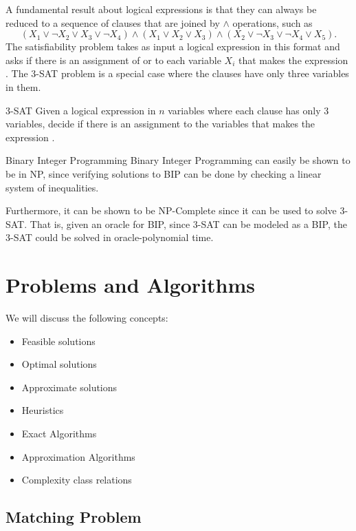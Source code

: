 A fundamental result about logical expressions is that they can always be reduced to a sequence of clauses that are joined by $\land$ operations, such as 
\begin{equation}
(X_1 \lor \neg X_2 \lor X_3 \lor \neg X_4) \land (X_1 \lor X_2 \lor X_3) \land (X_2 \lor \neg X_3 \lor \neg X_4 \lor X_5).
\end{equation}
The satisfiability problem takes as input a logical expression in this format and asks if there is an assignment of \true  or \false to each variable $X_i$ that makes the expression \true.  The 3-SAT problem is a special case where the clauses have only three variables in them.
 
\begin{general}{3-SAT}{\npcomplete}
Given a logical expression in $n$ variables where each clause has only 3 variables, decide if there is an assignment to the variables that makes the expression \true.
\end{general}


\begin{general}{Binary Integer Programming}{\npcomplete}
Binary Integer Programming can easily be shown to be in NP, since verifying solutions to BIP can be done by checking a linear system of inequalities.  

Furthermore, it can be shown to be NP-Complete since it can be used to solve 3-SAT.  That is, given an oracle for BIP, since 3-SAT can be modeled as a BIP,  the 3-SAT could be solved in oracle-polynomial time.
\end{general}

\section{Problems and Algorithms}
We will discuss the following concepts:
\begin{itemize}
\item Feasible solutions
\item Optimal solutions
\item Approximate solutions
\item Heuristics
\item Exact Algorithms
\item Approximation Algorithms
\item Complexity class relations
\end{itemize}


\subsection{Matching Problem}




